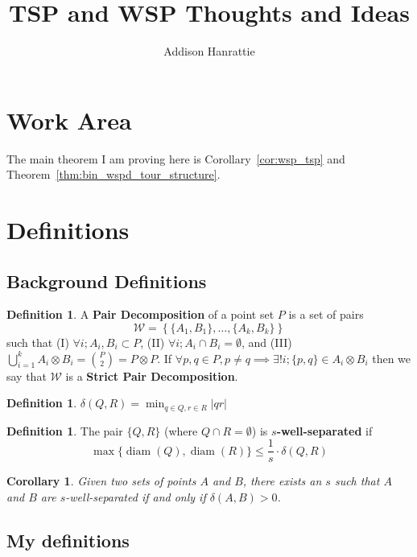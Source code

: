 \documentclass{article}
\title{TSP and WSP Thoughts and Ideas}
\author{Addison Hanrattie}
\newcommand{\PairDecomp}{\mathcal{W}}
\newtheorem{corollary}{Corollary}[thm]
\theoremstyle{definition}
\newtheorem{defn}[thm]{Definition}
\newcommand{\dist}{\delta}
\DeclareMathOperator{\diam}{diam}
\begin{document}
\maketitle

\tableofcontents

\section{Work Area}
The main theorem I am proving here is Corollary~\ref{cor:wsp_tsp} and Theorem~\ref{thm:bin_wspd_tour_structure}.

\section{Definitions}
\subsection{Background Definitions}
\begin{defn}
    A \textbf{Pair Decomposition} of a point set $P$ is a set of pairs
    $$\PairDecomp = \left\{ \{A_1, B_1\}, \ldots, \{A_k,B_k\} \right\}$$
    such that (I) $\forall i; A_i,B_i \subset P$, (II) $\forall i; A_i \cap B_i = \emptyset$, and (III) $\bigcup_{i=1}^k A_i \otimes B_i = \binom{P}{2} = P \otimes P$.
    If $\forall p,q \in P, p \neq q \implies \exists! i; \{p,q\} \in A_i \otimes B_i$ then we say that $\PairDecomp$ is a \textbf{Strict Pair Decomposition}.
\end{defn}

\begin{defn}
    $\dist(Q,R) = \min_{q \in Q, r \in R} |qr|$
\end{defn}

\begin{defn}
    The pair $\{Q,R\}$ (where $Q \cap R = \emptyset$) is \textbf{$s$-well-separated} if
    $$\max\{\diam(Q), \diam(R)\} \leq \frac{1}{s} \cdot \dist(Q,R)$$
\end{defn}

\begin{corollary}
    Given two sets of points $A$ and $B$, there exists an $s$ such that $A$ and $B$ are $s$-well-separated if and only if $\dist(A,B) > 0$.
\end{corollary}

\subsection{My definitions}
\end{document}
